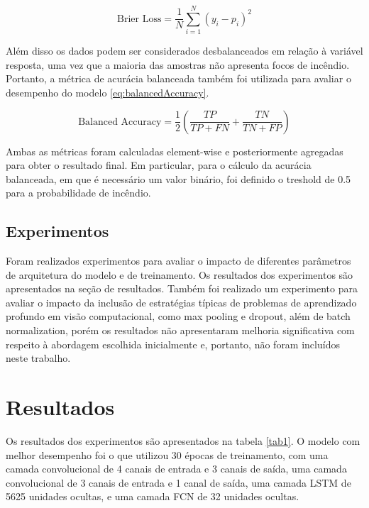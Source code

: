 \documentclass[journal]{IEEEtran}
\begin{document}
\begin{equation}
    \text{Brier Loss} = \frac{1}{N} \sum_{i=1}^{N} (y_{i} - p_{i})^{2} \label{eq:brierLoss}
\end{equation}

Além disso os dados podem ser considerados desbalanceados em relação à variável resposta, uma vez que a maioria das amostras não apresenta focos de incêndio. Portanto, a métrica de acurácia balanceada também foi utilizada para avaliar o desempenho do modelo \ref{eq:balancedAccuracy}.

\begin{equation}
    \text{Balanced Accuracy} = \frac{1}{2} \left( \frac{TP}{TP + FN} + \frac{TN}{TN + FP} \right) \label{eq:balancedAccuracy}
\end{equation}

Ambas as métricas foram calculadas element-wise e posteriormente agregadas para obter o resultado final. Em particular, para o cálculo da acurácia balanceada, em que é necessário um valor binário, foi definido o treshold de 0.5 para a probabilidade de incêndio.\newline

\subsection{Experimentos}

Foram realizados experimentos para avaliar o impacto de diferentes parâmetros de arquitetura do modelo e de treinamento. Os resultados dos experimentos são apresentados na seção de resultados. Também foi realizado um experimento para avaliar o impacto da inclusão de estratégias típicas de problemas de aprendizado profundo em visão computacional, como max pooling e dropout, além de batch normalization, porém os resultados não apresentaram melhoria significativa com respeito à abordagem escolhida inicialmente e, portanto, não foram incluídos neste trabalho.

\section{Resultados}

Os resultados dos experimentos são apresentados na tabela \ref{tab1}. O modelo com melhor desempenho foi o que utilizou 30 épocas de treinamento, com uma camada convolucional de 4 canais de entrada e 3 canais de saída, uma camada convolucional de 3 canais de entrada e 1 canal de saída, uma camada LSTM de 5625 unidades ocultas, e uma camada FCN de 32 unidades ocultas.
\end{document}
